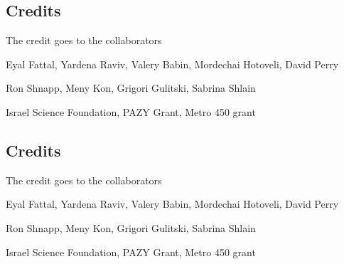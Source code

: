 \documentclass[aspectratio=43]{beamer}
\begin{document}



\subsection{Credits}

\begin{frame}[label=credit-1a]{The credit goes to the collaborators }
\begin{multicols}{2}
\centering
{} 
\end{multicols}
\end{frame}
%
\begin{frame}[label=credit-2]
\begin{card}
Eyal Fattal, Yardena Raviv, Valery Babin, Mordechai Hotoveli, David Perry
\end{card}
\begin{card}[TAU]
Ron Shnapp, Meny Kon, Grigori Gulitski, Sabrina Shlain
\end{card}
\begin{card}[Funding]
Israel Science Foundation, PAZY Grant, Metro 450 grant
\end{card}
\end{frame}
%

\subsection{Credits}

\begin{frame}[label=credit-1]{The credit goes to the collaborators }
\begin{multicols}{2}
\centering
{} 
\end{multicols}
\end{frame}
%
\begin{frame}[label=credit-2]
\begin{card}
Eyal Fattal, Yardena Raviv, Valery Babin, Mordechai Hotoveli, David Perry
\end{card}
\begin{card}[TAU]
Ron Shnapp, Meny Kon, Grigori Gulitski, Sabrina Shlain
\end{card}
\begin{card}[Funding]
Israel Science Foundation, PAZY Grant, Metro 450 grant
\end{card}
\end{frame}
%
\end{document}
